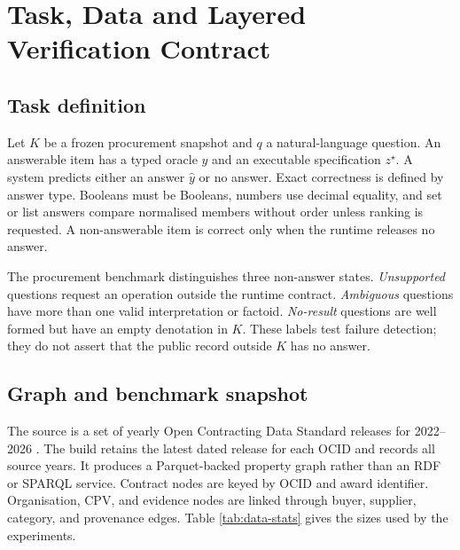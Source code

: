 \section{Task, Data and Layered Verification Contract}
\label{sec:task}

\subsection{Task definition}

Let $K$ be a frozen procurement snapshot and $q$ a natural-language question.  An answerable item
has a typed oracle $y$ and an executable specification $z^\star$.  A system predicts either an
answer $\hat{y}$ or no answer.  Exact correctness is defined by answer type.  Booleans must be
Booleans, numbers use decimal equality, and set or list answers compare normalised members without
order unless ranking is requested.  A non-answerable item is correct only when the runtime releases
no answer.

The procurement benchmark distinguishes three non-answer states.  \emph{Unsupported} questions
request an operation outside the runtime contract.  \emph{Ambiguous} questions have more than one
valid interpretation or factoid.  \emph{No-result} questions are well formed but have an empty
denotation in $K$.  These labels test failure detection; they do not assert that the public record outside $K$ has
no answer.

\subsection{Graph and benchmark snapshot}

The source is a set of yearly Open Contracting Data Standard releases for 2022--2026
\citep{ocds}.  The build retains the latest dated release for each OCID and records all source years.
It produces a Parquet-backed property graph rather than an RDF or SPARQL service.  Contract nodes
are keyed by OCID and award identifier.  Organisation, CPV, and evidence nodes are linked through
buyer, supplier, category, and provenance edges.  Table \ref{tab:data-stats} gives the sizes used by
the experiments.


